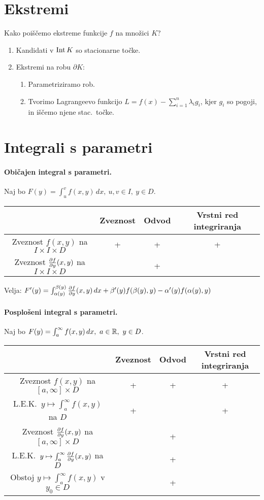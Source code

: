 \section{Ekstremi}
Kako poiščemo ekstreme funkcije $f$ na množici $K$?
\begin{enumerate}
    \item Kandidati v $\operatorname{Int} K$ so stacionarne točke.
    \item Ekstremi na robu $\partial K$:
    \begin{enumerate}
        \item Parametriziramo rob.
        \item Tvorimo Lagrangeevo funkcijo $L = f(x) - \sum_{i=1}^{n}\lambda_i g_i$, kjer $g_i$ so pogoji, in iščemo njene stac.\ točke.
    \end{enumerate}
\end{enumerate}

\section{Integrali s parametri}
\paragraph{Običajen integral s parametri.}
Naj bo \(F(y) = \int_{u}^{v} f(x,y) \, dx, \ u,v \in I, \ y \in D\).
\begin{center}
    \begin{tabular}{ c | c | c | c }
     & Zveznost & Odvod & Vrstni red integriranja \\ \hline
    Zveznost \(f(x,y)\) na \(I \times I \times D\) & + & + & + \\  [0.5ex]
    Zveznost \(\frac{\partial f}{\partial y}(x,y)\) na \(I \times I \times D\) &  & + &   
    \end{tabular}
\end{center}

Velja: \(F'(y) = \int_{\alpha(y)}^{\beta(y)} \frac{\partial f}{\partial y}(x,y) \, dx + \beta'(y)f(\beta(y), y) - \alpha'(y)f(\alpha(y), y)\)

\paragraph{Posplošeni integral s parametri.} Naj bo \(F(y) = \int_{a}^{\infty} f(x,y) \, dx, \ a \in \mathbb{R}, \ y \in D\).
\begin{center}
    \begin{tabular}{ c | c | c | c }
     & Zveznost & Odvod & Vrstni red integriranja \\ \hline 
    Zveznost \(f(x,y)\) na \([a, \infty] \times D\) & + & + & + \\ [0.5ex]
    L.E.K.\ \( y \mapsto \int_{a}^{\infty} f(x,y)\) na \(D\) & + &  & + \\ [0.5ex]
    Zveznost \(\frac{\partial f}{\partial y}(x,y)\) na \([a, \infty] \times D\) &  & + &  \\ [0.5ex]
    L.E.K.\ \( y \mapsto \int_{a}^{\infty} \frac{\partial f}{\partial y}(x,y)\) na \(D\) &  & + & \\ [0.5ex]
    Obstoj \( y \mapsto \int_{a}^{\infty} f(x,y)\) v \(y_0 \in D\) & & + &
    \end{tabular}
\end{center}

